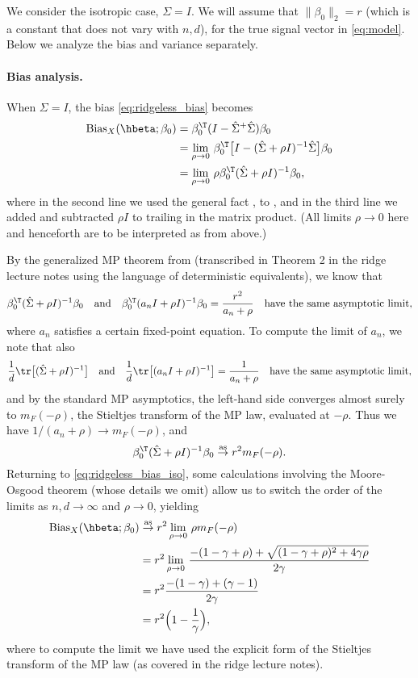 \documentclass{article}
\begin{document}
We consider the isotropic case, $\Sigma = I$.  We will assume that $\|\beta_0\|_2
= r$ (which is a constant that does not vary with $n,d$), for the true signal
vector in \eqref{eq:model}. Below we analyze the bias and variance separately.

\paragraph{Bias analysis.}

When $\Sigma = I$, the bias \eqref{eq:ridgeless_bias} becomes 
\begin{align}
\nonumber
\Bias_X(\hbeta; \beta_0) 
&= \beta_0^\T (I - \hSigma^+ \hSigma) \beta_0 \\ 
\nonumber
&= \lim_{\rho \to 0} \, \beta_0^\T \big[ I - (\hSigma + \rho I)^{-1} \hSigma  
  \big] \beta_0 \\   
\label{eq:ridgeless_bias_iso}
&= \lim_{\rho \to 0} \, \rho \beta_0^\T (\hSigma + \rho I)^{-1} \beta_0,  
\end{align}
where in the second line we used the general fact , to , and in the third line we added and subtracted $\rho I$ to
trailing \smash{$\hSigma$} in the matrix product. (All limits $\rho \to 0$ here  
and henceforth are to be interpreted as from above.) 

By the generalized MP theorem from \citet{rubio2011spectral} (transcribed in
Theorem 2 in the ridge lecture notes using the language of deterministic
equivalents), we know that  
\[
\beta_0^\T (\hSigma + \rho I)^{-1} \beta_0 \quad \text{and} \quad 
\beta_0^\T (a_n I + \rho I)^{-1} \beta_0 = \frac{r^2}{a_n + \rho} \quad
\text{have the same asymptotic limit},
\]
where $a_n$ satisfies a certain fixed-point equation. To compute the limit of
$a_n$, we note that also
\[
\frac{1}{d} \tr \big[ (\hSigma + \rho I)^{-1} \big] \quad \text{and} \quad  
\frac{1}{d} \tr \big[ (a_n I + \rho I)^{-1} \big] = \frac{1}{a_n + \rho}
\quad \text{have the same asymptotic limit},  
\]
and by the standard MP asymptotics, the left-hand side converges almost surely
to $m_F(-\rho)$, the Stieltjes transform of the MP law, evaluated at
$-\rho$. Thus we have $1/(a_n + \rho) \to m_F(-\rho)$, and    
\[
\beta_0^\T (\hSigma + \rho I)^{-1} \beta_0 \asto r^2 m_F(-\rho). 
\]
Returning to \eqref{eq:ridgeless_bias_iso}, some calculations involving the
Moore-Osgood theorem (whose details we omit) allow us to switch the order of the
limits as $n,d \to \infty$ and $\rho \to 0$, yielding
\begin{align}
\nonumber
\Bias_X(\hbeta; \beta_0) &\asto r^2 \lim_{\rho \to 0} \, \rho m_F(-\rho) \\
\nonumber
&= r^2 \lim_{\rho \to 0} \, \frac{-(1 - \gamma + \rho) + \sqrt{(1 - \gamma +
  \rho)^2 + 4 \gamma \rho}}{2 \gamma} \\
\nonumber
&= r^2 \frac{-(1-\gamma) + (\gamma-1)}{2 \gamma} \\
\label{eq:ridgeless_bias_iso_limit}
&= r^2 \Big( 1- \frac{1}{\gamma} \Big),
\end{align}
where to compute the limit we have used the explicit form of the Stieltjes
transform of the MP law (as covered in the ridge lecture notes).
\end{document}
